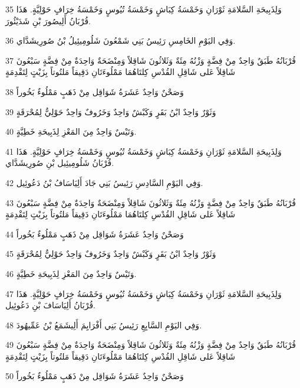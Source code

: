 \par 35 وَلِذَبِيحَةِ السَّلامَةِ ثَوْرَانِ وَخَمْسَةُ كِبَاشٍ وَخَمْسَةُ تُيُوسٍ وَخَمْسَةُ خِرَافٍ حَوْلِيَّةٍ. هَذَا قُرْبَانُ أَلِيصُورَ بْنِ شَدَيْئُورَ.
\par 36 وَفِي اليَوْمِ الخَامِسِ رَئِيسُ بَنِي شَمْعُونَ شَلُومِيئِيلُ بْنُ صُورِيشَدَّاي.
\par 37 قُرْبَانُهُ طَبَقٌ وَاحِدٌ مِنْ فِضَّةٍ وَزْنُهُ مِئَةٌ وَثَلاثُونَ شَاقِلاً وَمِنْضَحَةٌ وَاحِدَةٌ مِنْ فِضَّةٍ سَبْعُونَ شَاقِلاً عَلى شَاقِلِ القُدْسِ كِلتَاهُمَا مَمْلُوءَتَانِ دَقِيقاً مَلتُوتاً بِزَيْتٍ لِتَقْدِمَةٍ
\par 38 وَصَحْنٌ وَاحِدٌ عَشَرَةُ شَوَاقِل مِنْ ذَهَبٍ مَمْلُوءٌ بَخُوراً
\par 39 وَثَوْرٌ وَاحِدٌ ابْنُ بَقَرٍ وَكَبْشٌ وَاحِدٌ وَخَرُوفٌ وَاحِدٌ حَوْلِيٌّ لِمُحْرَقَةٍ
\par 40 وَتَيْسٌ وَاحِدٌ مِنَ المَعْزِ لِذَبِيحَةِ خَطِيَّةٍ.
\par 41 وَلِذَبِيحَةِ السَّلامَةِ ثَوْرَانِ وَخَمْسَةُ كِبَاشٍ وَخَمْسَةُ تُيُوسٍ وَخَمْسَةُ خِرَافٍ حَوْلِيَّةٍ. هَذَا قُرْبَانُ شَلُومِيئِيل بْنِ صُورِيشَدَّاي.
\par 42 وَفِي اليَوْمِ السَّادِسِ رَئِيسُ بَنِي جَادَ أَلِيَاسَافُ بْنُ دَعُوئِيل.
\par 43 قُرْبَانُهُ طَبَقٌ وَاحِدٌ مِنْ فِضَّةٍ وَزْنُهُ مِئَةٌ وَثَلاثُونَ شَاقِلاً وَمِنْضَحَةٌ وَاحِدَةٌ مِنْ فِضَّةٍ سَبْعُونَ شَاقِلاً عَلى شَاقِلِ القُدْسِ كِلتَاهُمَا مَمْلُوءَتَانِ دَقِيقاً مَلتُوتاً بِزَيْتٍ لِتَقْدِمَةٍ
\par 44 وَصَحْنٌ وَاحِدٌ عَشَرَةُ شَوَاقِل مِنْ ذَهَبٍ مَمْلُوءٌ بَخُوراً
\par 45 وَثَوْرٌ وَاحِدٌ ابْنُ بَقَرٍ وَكَبْشٌ وَاحِدٌ وَخَرُوفٌ وَاحِدٌ حَوْلِيٌّ لِمُحْرَقَةٍ
\par 46 وَتَيْسٌ وَاحِدٌ مِنَ المَعْزِ لِذَبِيحَةِ خَطِيَّةٍ.
\par 47 وَلِذَبِيحَةِ السَّلامَةِ ثَوْرَانِ وَخَمْسَةُ كِبَاشٍ وَخَمْسَةُ تُيُوسٍ وَخَمْسَةُ خِرَافٍ حَوْلِيَّةٍ. هَذَا قُرْبَانُ أَلِيَاسَافَ بْنِ دَعُوئِيل.
\par 48 وَفِي اليَوْمِ السَّابِعِ رَئِيسُ بَنِي أَفْرَايِمَ أَلِيشَمَعُ بْنُ عَمِّيهُودَ.
\par 49 قُرْبَانُهُ طَبَقٌ وَاحِدٌ مِنْ فِضَّةٍ وَزْنُهُ مِئَةٌ وَثَلاثُونَ شَاقِلاً وَمِنْضَحَةٌ وَاحِدَةٌ مِنْ فِضَّةٍ سَبْعُونَ شَاقِلاً عَلى شَاقِلِ القُدْسِ كِلتَاهُمَا مَمْلُوءَتَانِ دَقِيقاً مَلتُوتاً بِزَيْتٍ لِتَقْدِمَةٍ
\par 50 وَصَحْنٌ وَاحِدٌ عَشَرَةُ شَوَاقِل مِنْ ذَهَبٍ مَمْلُوءٌ بَخُوراً
